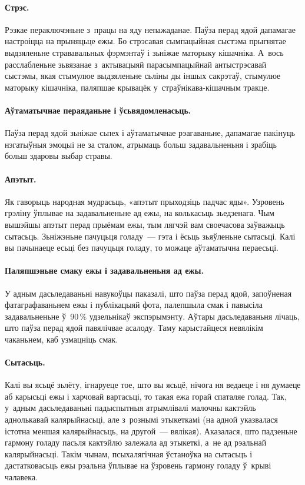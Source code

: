 \paragraph{Стрэс.}
Рэзкае пераключэньне з~працы на яду непажаданае. Паўза перад ядой дапамагае настроіцца на прыняцьце ежы. Бо стрэсавая сымпацыйная сыстэма прыгнятае выдзяленьне стрававальных фэрмэнтаў і зьніжае маторыку кішачніка. А~вось расслабленьне зьвязанае з~актывацыяй парасымпацыйнай антыстрэсавай сыстэмы, якая стымулюе выдзяленьне сьліны ды іншых сакрэтаў, стымулюе маторыку кішачніка, паляпшае крывацёк у~страўнікава-кішачным тракце.

\paragraph{Аўтаматычнае пераяданьне і ўсьвядомленасьць.}
Паўза перад ядой зьніжае сьпех і аўтаматычнае рэагаваньне, дапамагае пакінуць нэгатыўныя эмоцыі не за сталом, атрымаць больш задавальненьня і зрабіць больш здаровы выбар стравы.


\paragraph{Апэтыт.}
Як гаворыць народная мудрасьць, «апэтыт прыходзіць падчас яды». Узровень грэліну ўплывае на задавальненьне ад ежы, на колькасьць зьедзенага. Чым вышэйшы апэтыт перад прыёмам ежы, тым лягчэй вам своечасова заўважыць сытасьць. Зьніжэньне пачуцьця голаду~--- гэта і ёсьць зьяўленьне сытасьці. Калі вы пачынаеце есьці без пачуцьця голаду, то можаце аўтаматычна пераесьці.

\paragraph{Паляпшэньне смаку ежы і задавальненьня ад ежы.}
У адным дасьледаваньні навукоўцы паказалі, што паўза перад ядой, запоўненая фатаграфаваньнем ежы і публікацыяй фота, палепшыла смак і павысіла задавальненьне ў~90\,\% удзельнікаў экспэрымэнту. Аўтары дасьледаваньня лічаць, што паўза перад ядой павялічвае асалоду. Таму карыстайцеся невялікім чаканьнем, каб узмацніць смак.

\paragraph{Сытасьць.}
Калі вы ясьцё зьлёту, ігнаруеце тое, што вы ясьцё, нічога ня ведаеце і ня думаеце аб карысьці ежы і харчовай вартасьці, то такая ежа горай спаталяе голад. Так, у~адным дасьледаваньні падыспытныя атрымлівалі малочны кактэйль аднолькавай калярыйнасьці, але з~рознымі этыкеткамі (на адной указвалася істотна меншая калярыйнасьць, на другой~--- вялікая). Аказалася, што падзеньне гармону голаду пасьля кактэйлю залежала ад этыкеткі, а~не ад рэальнай калярыйнасьці. Такім чынам, псыхалягічная ўстаноўка на сытасьць і дастатковасьць ежы рэальна ўплывае на ўзровень гармону голаду ў~крыві чалавека.

